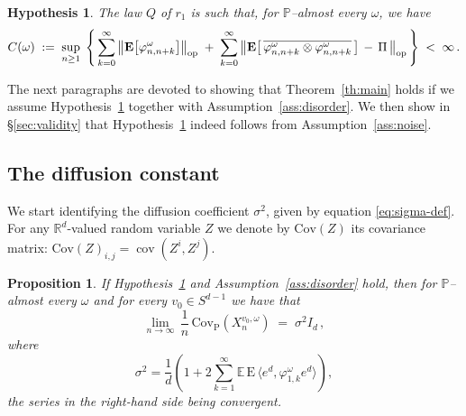 \documentclass[a4paper,reqno,11pt]{amsart}
\numberwithin{equation}{section}
\newtheorem{proposition}[theorem]{Proposition}
\newtheorem{hypothesis}[theorem]{Hypothesis}
\newcommand{\bbE}{{\ensuremath{\mathbb E}} }
\newcommand{\bbP}{{\ensuremath{\mathbb P}} }
\newcommand{\gs}{\sigma}
\newcommand{\go}{\omega}
\newcommand{\R}{\mathbb{R}}
\DeclareMathOperator{\cov}{cov}
\def\bP{\ensuremath{\bs{\mathrm{P}}}}
\def\bE{\ensuremath{\bs{\mathrm{E}}}}
\def\bs{\boldsymbol}
\renewcommand{\phi}{\varphi}
\begin{document}
\medskip

\begin{hypothesis}
\label{hyp:main}
The law $Q$ of $r_1$ is such that, for $\bbP$--almost every $\omega$, we have
\begin{equation}
 C(\go) \;:=\;
 \sup_{n \ge 1} \; \left\{ \, \sum_{k=0}^\infty \big\|
 \bE \big[ \phi^{\go}_{n,n+k} \big] \big\|_{\rm{op}} \;+\;
 \sum_{k=0}^\infty \big\|
 \bE \big[\, \overline{\phi^{\go}_{n,n+k} \otimes \phi^{\go}_{n,n+k}} \, \big]
 \,-\, \Pi \, \big\|_{\rm{op}} \,\right\} \;<\; \infty\,.
 \end{equation}
\end{hypothesis}

\smallskip
\noindent
The next paragraphs are devoted to showing that
Theorem~\ref{th:main} holds if we assume Hypothesis~\ref{hyp:main}
together with Assumption~\ref{ass:disorder}. We then show
in \S\ref{sec:validity} that Hypothesis~\ref{hyp:main} indeed
follows from Assumption~\ref{ass:noise}.


\smallskip

\subsection{The diffusion constant}

We start identifying the diffusion coefficient $\gs^2$,
given by equation \eqref{eq:sigma-def}.
For any $\R^d$-valued random variable $Z$ we denote by $\mathrm{Cov}(Z)$
its covariance matrix: $\mathrm{Cov}(Z)_{i,j}= \cov(Z^i,Z ^j)$.


\begin{proposition}
\label{th:lem1}
If Hypothesis~\ref{hyp:main} and Assumption~\ref{ass:disorder} hold,
then for $\bbP$--almost every $\go$ and for every $v_0 \in S^{d-1}$ we have that
\begin{equation}
\label{eq:lem1}
\lim_{n \to \infty} \, \frac 1n \,
\mathrm{Cov}_{\bP} \left(
X_n^{v_0, \go}
\right)
\; =\; \sigma^2 I_d \,,
\end{equation}
where
\begin{equation} \label{eq:sigma2-def}
\sigma^2 =
\frac 1d \left( 1+2 \sum_{k=1}^\infty
\bbE \, \bE \, \langle e^d, \varphi^\omega_{1,k} e^d \rangle
\right),
\end{equation}
the series in the right-hand side being convergent.
\end{proposition}

\medskip
\end{document}
